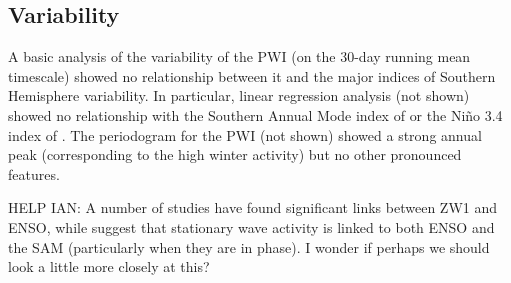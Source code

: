 \subsection{Variability}

A basic analysis of the variability of the PWI (on the 30-day running mean timescale) showed no relationship between it and the major indices of Southern Hemisphere variability. In particular, linear regression analysis (not shown) showed no relationship with the Southern Annual Mode index of \citet{Marshall2003} or the Ni\~{n}o 3.4 index of \citet{Trenberth2001}. The periodogram for the PWI (not shown) showed a strong annual peak (corresponding to the high winter activity) but no other pronounced features.

HELP IAN: A number of studies \citep[e.g.][]{Trenberth1980,Raphael2003,Hobbs2007} have found significant links between ZW1 and ENSO, while \citet{Pezza2012} suggest that stationary wave activity is linked to both ENSO and the SAM (particularly when they are in phase). I wonder if perhaps we should look a little more closely at this? 